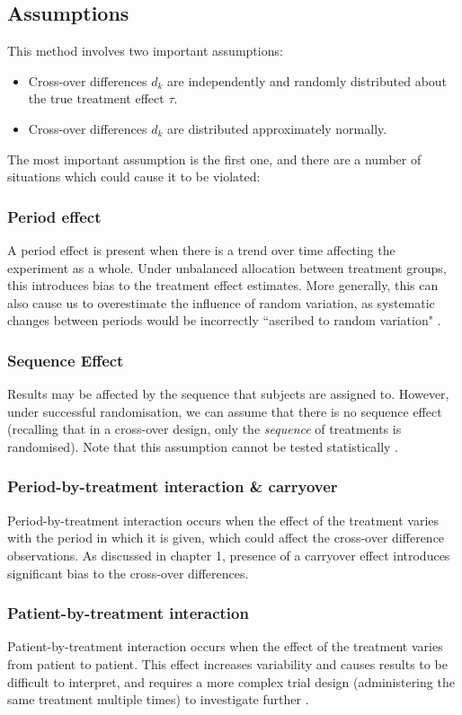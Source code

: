 \documentclass[12pt, TexShade, letterpaper]{report}
\begin{document}
\subsection{Assumptions}
This method involves two important assumptions:
\begin{itemize}
    \item Cross-over differences $d_k$ are independently and randomly distributed about the true treatment effect $\tau$.
    \item Cross-over differences $d_k$ are distributed approximately normally.
\end{itemize}
The most important assumption is the first one, and there are a number of situations which could cause it to be violated:

\subsubsection{Period effect}
A period effect is present when there is a trend over time affecting the experiment as a whole. Under unbalanced allocation between treatment groups, this introduces bias to the treatment effect estimates. More generally, this can also cause us to overestimate the influence of random variation, as systematic changes between periods would be incorrectly ``ascribed to random variation" \cite{senn2002crossover}.

\subsubsection{Sequence Effect}
Results may be affected by the sequence that subjects are assigned to. However, under successful randomisation, we can assume that there is no sequence effect \cite{lim2021considerations} (recalling that in a cross-over design, only the \textit{sequence} of treatments is randomised). Note that this assumption cannot be tested statistically \cite{lim2021considerations}.

\subsubsection{Period-by-treatment interaction \& carryover}
Period-by-treatment interaction occurs when the effect of the treatment varies with the period in which it is given, which could affect the cross-over difference observations. As discussed in chapter 1, presence of a carryover effect introduces significant bias to the cross-over differences.

\subsubsection{Patient-by-treatment interaction}
Patient-by-treatment interaction occurs when the effect of the treatment varies from patient to patient. This effect increases variability and causes results to be difficult to interpret, and requires a more complex trial design (administering the same treatment multiple times) to investigate further \cite{senn2002crossover}.
\end{document}
